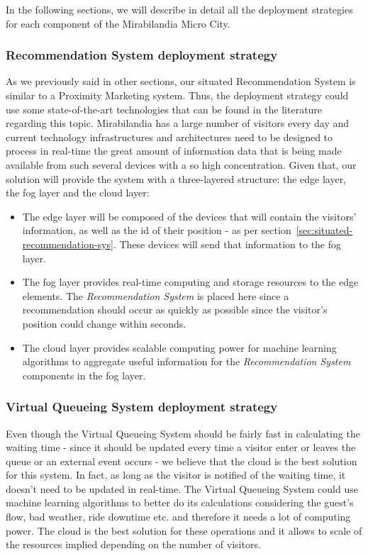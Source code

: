 In the following sections, we will describe in detail all the deployment strategies for each component of the Mirabilandia Micro City.

\subsubsection{Recommendation System deployment strategy}
As we previously said in other sections, our situated Recommendation System is similar to a Proximity Marketing system. Thus, the deployment strategy
could use some state-of-the-art technologies that can be found in the literature regarding this topic. Mirabilandia has a large number of visitors
every day and current technology infrastructures and architectures need to be designed to process in real-time the great amount of information data
that is being made available from such several devices with a so high concentration. Given that, our solution will provide the system with a
three-layered structure: the edge layer, the fog layer and the cloud layer:
\begin{itemize}
	\item The edge layer will be composed of the devices that will contain the visitors' information, as well as the id of their position - as per
	      section~\ref{sec:situated-recommendation-sys}. These devices will send that information to the fog layer.
	\item The fog layer provides real-time computing and storage resources to the edge elements. The \textit{Recommendation System} is placed here since a
	      recommendation should occur as quickly as possible since the visitor's position could change within seconds.
	\item The cloud layer provides scalable computing power for machine learning algorithms to aggregate useful information for the \textit{Recommendation
		      System} components in the fog layer.
\end{itemize}

\subsubsection{Virtual Queueing System deployment strategy}
Even though the Virtual Queueing System should be fairly fast in calculating the waiting time - since it should be updated every time a visitor enter
or leaves the queue or an external event occurs - we believe that the cloud is the best solution for this system. In fact, as long as the visitor is
notified of the waiting time, it doesn't need to be updated in real-time. The Virtual Queueing System could use machine learning algorithms to better
do its calculations considering the guest's flow, bad weather, ride downtime etc. and therefore it needs a lot of computing power. The cloud is the
best solution for these operations and it allows to scale of the resources implied depending on the number of visitors.


